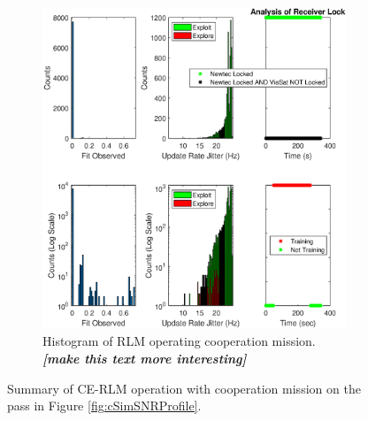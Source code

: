 \begin{figure}[ht]
\begin{subfigure}{\linewidth}
	\includegraphics[scale=0.5]{figures/c_sim_results/sim22_RLM_hists_coop.eps}
	\caption{Histogram of RLM operating cooperation mission. \textit{\textbf{[make this text more interesting]}}}
	\label{fig:cSimLMHists}
\end{subfigure}
\caption{Summary of CE-RLM operation with cooperation mission on the pass in Figure \ref{fig:cSimSNRProfile}.}
\label{fig:c22RLMCoop}
\end{figure}
